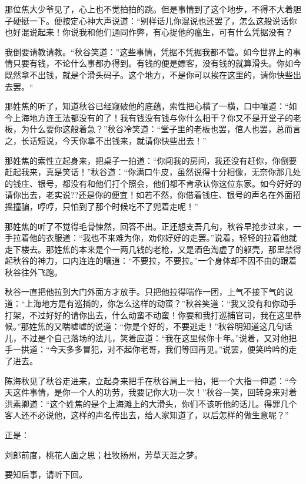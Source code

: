 \documentclass[12pt,UTF8]{ctexbook}
\begin{document}
{{{那位焦大少爷见了，心上也不觉拍拍的跳。但是事情到了这个地步，不得不大着胆子硬挺一下。便按定心神大声说道：“别样话儿你混说也还罢了，怎么这般说话你也好混说起来！你说我和他们通同作弊，有心捉他的瘟生，可有什么凭据没有？

我倒要请教请教。“秋谷笑道：”这些事情，凭据不凭据我都不管。如今世界上的事情只要有钱，不论什么事都办得到。有钱的便是嫖客，没有钱的就算滑头。你如今既然拿不出钱，就是个滑头码子。这个地方，不是你可以挨在这里的，请你快些出去罢。“

那姓焦的听了，知道秋谷已经窥破他的底蕴，索性把心横了一横，口中嚷道：“如今上海地方连王法都没有的了！我有钱没有钱与你什么相干？你又不是开堂子的老板，为什么要你这般着急？”秋谷冷笑道：“堂子里的老板也罢，倌人也罢，总而言之，长话短说，今天你拿不出钱来，就请你快些出去！”

那姓焦的索性立起身来，把桌子一拍道：“你闯我的房间，我还没有赶你，你倒要赶起我来，真是笑话！”秋谷道：“你满口牛皮，虽然说得十分相像，无奈你那几处的钱庄、银号，都没有和他们打个照会，他们都不肯承认你这位东家。如今好好的请你出去，老实说??还是你的便宜！如若不然，你借着钱庄、银号的声名在外面招摇撞骗，哼哼，只怕到了那个时候吃不了兜着走呢！”

那姓焦的听了不觉得毛骨悚然，回答不出。正还想支吾几句，秋谷早抢步过来，一手拉着他的衣服道：“我也不来难为你，劝你好好的走罢。”说着，轻轻的拉着他就走下楼去。那姓焦的本来是个一两几钱的老枪，又是酒色淘虚了的躯壳，那里禁得起秋谷的神力，口内连连的嚷道：“不要拉，不要拉。”一个身体却不因不由的跟着秋谷往外飞跑。

秋谷一直把他拉到大门外面方才放手。只把他拉得喘作一团，上气不接下气的说道：“上海地方是有巡捕的，你怎么这样的动蛮？”秋谷笑道：“我又没有和你动手打架，不过好好的请你出去，什么动蛮不动蛮！你要和我打巡捕官司，我在这里恭候。”那姓焦的又喘嘘嘘的说道：“你是个好的，不要逃走！”秋谷明知道这几句话儿，不过是个自己落场的法儿，笑着应道：“我在这里候你十年。”说着，又对他把手一拱道：“今天多多冒犯，对不起你老哥，我们等回再见。”说罢，便笑吟吟的走了进去。

陈海秋见了秋谷走进来，立起身来把手在秋谷肩上一拍，把一个大指一伸道：“今天这件事情，是你一个人的功劳，我要记你大功一次！”秋谷一笑，回转身来对着洪素卿道：“这个姓焦的是个上海滩上的大滑头，你们不该听他的话儿。得罪几个客人还不必说他，这样的声名传出去，给人家知道了，以后怎样的做生意呢？”

正是：

刘郎前度，桃花人面之思；杜牧扬州，芳草天涯之梦。

要知后事，请听下回。





}}}
\end{document}
